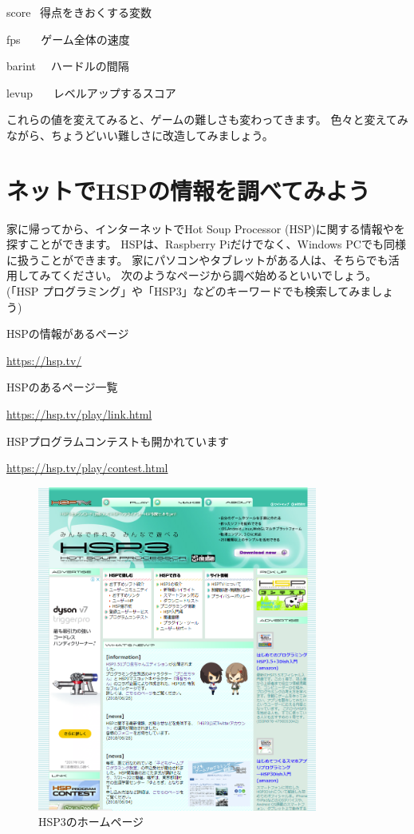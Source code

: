 \begin{description}
    \item score \ 得点をきおくする変数
    \item fps \ \ \ ゲーム全体の速度
    \item barint \ \ ハードルの間隔
    \item levup \ \ \ レベルアップするスコア
\end{description}

これらの値を変えてみると、ゲームの難しさも変わってきます。
色々と変えてみながら、ちょうどいい難しさに改造してみましょう。

\clearpage
\section{ネットでHSPの情報を調べてみよう}

家に帰ってから、インターネットでHot Soup Processor (HSP)に関する情報やを探すことができます。
HSPは、Raspberry Piだけでなく、Windows PCでも同様に扱うことができます。
家にパソコンやタブレットがある人は、そちらでも活用してみてください。
次のようなページから調べ始めるといいでしょう。(「HSP プログラミング」や「HSP3」などのキーワードでも検索してみましょう)

HSPの情報があるページ

\url{https://hsp.tv/}

HSPのあるページ一覧

\url{https://hsp.tv/play/link.html}

HSPプログラムコンテストも開かれています

\url{https://hsp.tv/play/contest.html}

\begin{figure}[H]
    \begin{center}
        \includegraphics[keepaspectratio,width=9.202cm,height=10.717cm]{text02-img/text02-img055.png}
        \caption{HSP3のホームページ}
    \end{center}
\end{figure}

